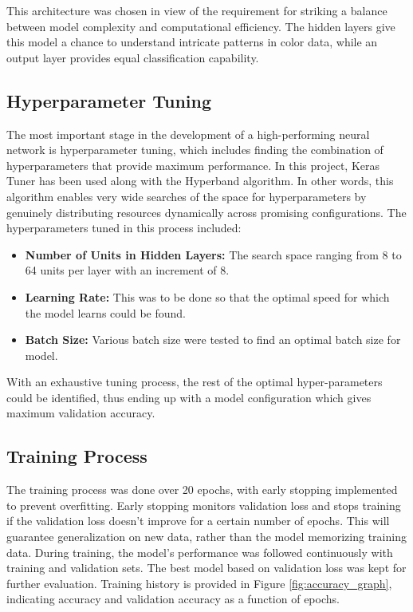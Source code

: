\documentclass{article}
\begin{document}
This architecture was chosen in view of the requirement for striking a balance between model complexity and computational efficiency. The hidden layers give this model a chance to understand intricate patterns in color data, while an output layer provides equal classification capability.
\subsection{Hyperparameter Tuning}

The most important stage in the development of a high-performing neural network is hyperparameter tuning, which includes finding the combination of hyperparameters that provide maximum performance. In this project, Keras Tuner has been used along with the Hyperband algorithm. In other words, this algorithm enables very wide searches of the space for hyperparameters by genuinely distributing resources dynamically across promising configurations.
The hyperparameters tuned in this process included:
\begin{itemize}
    \item \textbf{Number of Units in Hidden Layers:} The search space ranging from 8 to 64 units per layer with an increment of 8.
    \item \textbf{Learning Rate:} This was to be done so that the optimal speed for which the model learns could be found.
    \item \textbf{Batch Size:} Various batch size were tested to find an optimal batch size for model.   \end{itemize}

With an exhaustive tuning process, the rest of the optimal hyper-parameters could be identified, thus ending up with a model configuration which gives maximum validation accuracy.
\subsection{Training Process}

The training process was done over 20 epochs, with early stopping implemented to prevent overfitting. Early stopping monitors validation loss and stops training if the validation loss doesn't improve for a certain number of epochs. This will guarantee generalization on new data, rather than the model memorizing training data.
During training, the model's performance was followed continuously with training and validation sets. The best model based on validation loss was kept for further evaluation. Training history is provided in Figure \ref{fig:accuracy_graph}, indicating accuracy and validation accuracy as a function of epochs.
\end{document}
